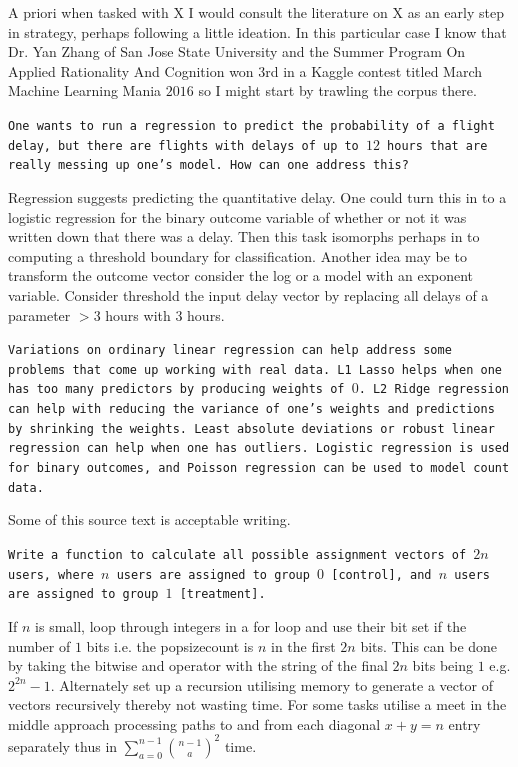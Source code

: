 A priori when tasked with X I would consult the literature on X as an early step in strategy, perhaps following a little ideation. In this particular case I know that Dr. Yan Zhang of San Jose State University and the Summer Program On Applied Rationality And Cognition won $3$rd in a Kaggle contest titled March Machine Learning Mania $2016$ so I might start by trawling the corpus there.

\texttt{One wants to run a regression to predict the probability of a flight delay, but there are flights with delays of up to $12$ hours that are really messing up one's model. How can one address this?}

Regression suggests predicting the quantitative delay. One could turn this in to a logistic regression for the binary outcome variable of whether or not it was written down that there was a delay. Then this task isomorphs perhaps in to computing a threshold boundary for classification. Another idea may be to transform the outcome vector consider the log or a model with an exponent variable. Consider threshold the input delay vector by replacing all delays of a parameter $>3$ hours with $3$ hours.

\texttt{Variations on ordinary linear regression can help address some problems that come up working with real data. L1 Lasso helps when one has too many predictors by producing weights of $0$. L2 Ridge regression can help with reducing the variance of one's weights and predictions by shrinking the weights. Least absolute deviations or robust linear regression can help when one has outliers. Logistic regression is used for binary outcomes, and Poisson regression can be used to model count data.}

Some of this source text is acceptable writing.

\texttt{Write a function to calculate all possible assignment vectors of $2n$ users, where $n$ users are assigned to group $0$ [control], and $n$ users are assigned to group $1$ [treatment].}

If $n$ is small, loop through integers in a for loop and use their bit set if the number of $1$ bits i.e. the popsizecount is $n$ in the first $2n$ bits. This can be done by taking the bitwise and operator with the string of the final $2n$ bits being $1$ e.g. $2^{2n}-1$. Alternately set up a recursion utilising memory to generate a vector of vectors recursively thereby not wasting time. For some tasks utilise a meet in the middle approach processing paths to and from each diagonal $x+y=n$ entry separately thus in $\sum_{a=0}^{n-1} \binom{n-1}{a}^2$ time.

